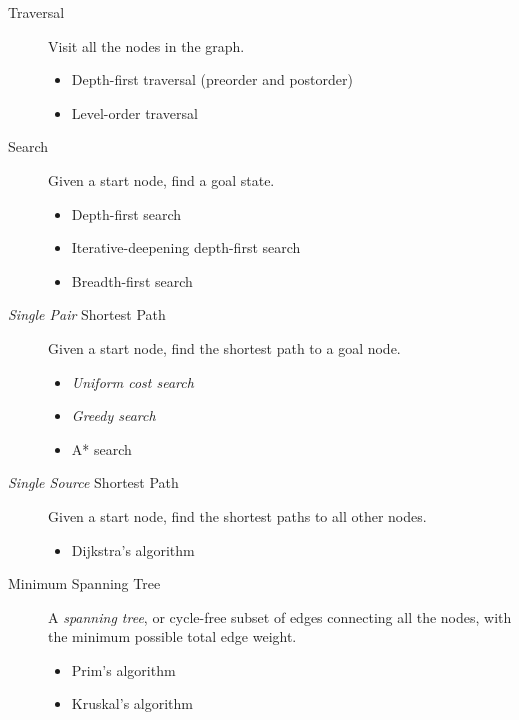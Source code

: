 \begin{description}
\item[Traversal] Visit all the nodes in the graph.
\begin{itemize}[$\cdot$]
\item Depth-first traversal (preorder and postorder)
\item Level-order traversal
\end{itemize}

\item[Search] Given a start node, find a goal state.
\begin{itemize}[$\cdot$]
\item Depth-first search
\item Iterative-deepening depth-first search
\item Breadth-first search
\end{itemize}

\item[\emph{Single Pair} Shortest Path] Given a start node, find the shortest
path to a goal node.
\begin{itemize}[$\cdot$]
\item \emph{Uniform cost search}
\item \emph{Greedy search}
\item A* search
\end{itemize}

\item[\emph{Single Source} Shortest Path] Given a start node, find the shortest
paths to all other nodes.
\begin{itemize}[$\cdot$]
\item Dijkstra's algorithm
\end{itemize}

\item[Minimum Spanning Tree] A \emph{spanning tree}, or cycle-free subset of
edges connecting all the nodes, with the minimum possible total edge weight.
\begin{itemize}[$\cdot$]
\item Prim's algorithm
\item Kruskal's algorithm
\end{itemize}
\end{description}
